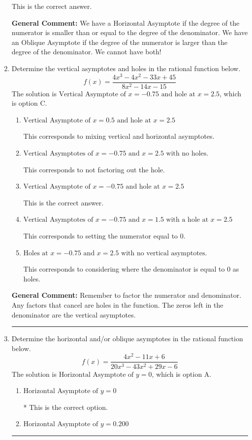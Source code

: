 \documentclass{extbook}[14pt]
\newcommand{\litem}[1]{\item #1

\rule{\textwidth}{0.4pt}}
\begin{document}
\begin{enumerate}
{\begin{enumerate}[label=\Alph*.]
This is the correct answer.
\end{enumerate}

\textbf{General Comment:} We have a Horizontal Asymptote if the degree of the numerator is smaller than or equal to the degree of the denominator. We have an Oblique Asymptote if the degree of the numerator is larger than the degree of the denominator. We cannot have both!
}
\litem{
Determine the vertical asymptotes and holes in the rational function below.
\[ f(x) = \frac{4x^{3} -4 x^{2} -33 x + 45}{8x^{2} -14 x -15} \]The solution is \( \text{Vertical Asymptote of } x = -0.75 \text{ and hole at } x = 2.5 \), which is option C.\begin{enumerate}[label=\Alph*.]
\item \( \text{Vertical Asymptote of } x = 0.5 \text{ and hole at } x = 2.5 \)

This corresponds to mixing vertical and horizontal asymptotes.
\item \( \text{Vertical Asymptotes of } x = -0.75 \text{ and } x = 2.5 \text{ with no holes.} \)

This corresponds to not factoring out the hole.
\item \( \text{Vertical Asymptote of } x = -0.75 \text{ and hole at } x = 2.5 \)

This is the correct answer.
\item \( \text{Vertical Asymptotes of } x = -0.75 \text{ and } x = 1.5 \text{ with a hole at } x = 2.5 \)

This corresponds to setting the numerator equal to 0.
\item \( \text{Holes at } x = -0.75 \text{ and } x = 2.5 \text{ with no vertical asymptotes.} \)

This corresponds to considering where the denominator is equal to 0 as holes.
\end{enumerate}

\textbf{General Comment:} Remember to factor the numerator and denominator. Any factors that cancel are holes in the function. The zeros left in the denominator are the vertical asymptotes.
}
\litem{
Determine the horizontal and/or oblique asymptotes in the rational function below.
\[ f(x) = \frac{4x^{2} -11 x + 6}{20x^{3} -43 x^{2} +29 x -6} \]The solution is \( \text{Horizontal Asymptote of } y = 0 \), which is option A.\begin{enumerate}[label=\Alph*.]
\item \( \text{Horizontal Asymptote of } y = 0 \)

* This is the correct option.
\item \( \text{Horizontal Asymptote of } y = 0.200  \)


\end{enumerate}}
\end{enumerate}
\end{document}

